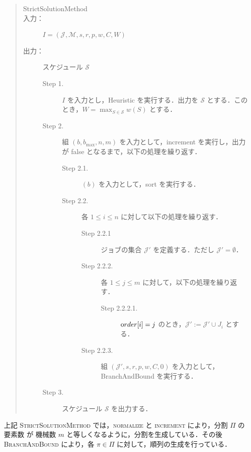 \documentclass[12pt]{optlab-bachelor}
\begin{document}
\begin{quote}
  \begin{description}
    \item[{\sc StrictSolutionMethod}]
    \item[入力：] $I = (\mathcal{J},\mathcal{M},s,r,p,w,C,W)$
    \item[出力：] スケジュール $\mathcal{S}$
    \begin{description}
      \item[Step 1.] $I$ を入力とし，{\sc Heuristic} を実行する．出力を $\mathcal{S}$ とする．このとき，$W = {\displaystyle \max_{S \in \mathcal{S}}w(S)}$ とする．
      \item[Step 2.] 組 $(b,b_{\max},n,m)$ を入力として，{\sc increment} を実行し，出力が {\sc false} となるまで，以下の処理を繰り返す．
      \begin{description}
        \item[Step 2.1.] $(b)$ を入力として，{\sc sort} を実行する．
        \item[Step 2.2.] 各 $1 \le i \le n$ に対して以下の処理を繰り返す．
        \begin{description}
          \item[Step 2.2.1] ジョブの集合 $\mathcal{J}'$ を定義する．ただし $\mathcal{J}' = \emptyset$．
          \item[Step 2.2.2.] 各 $1 \le j \le m$ に対して，以下の処理を繰り返す．
          \begin{description}
            \item[Step 2.2.2.1.] ${\mbox order}[i] = j$ のとき，$\mathcal{J}' :=\mathcal{J}' \cup J_i$ とする．
          \end{description}
          \item[Step 2.2.3.] 組 $(\mathcal{J}',s,r,p,w,C,0)$ を入力として，{\sc BranchAndBound} を実行する．
        \end{description}
      \end{description}
      \item[Step 3.] スケジュール $\mathcal{S}$ を出力する．
    \end{description}
  \end{description}
\end{quote}

上記 \textsc{StrictSolutionMethod} では，\textsc{normalize} と \textsc{increment} により，分割 $\Pi$ の要素数 が 機械数 $m$ と等しくなるように，分割を生成している．その後 \textsc{BranchAndBound} により，各 $\pi \in \Pi$ に対して，順列の生成を行っている．
\end{document}
